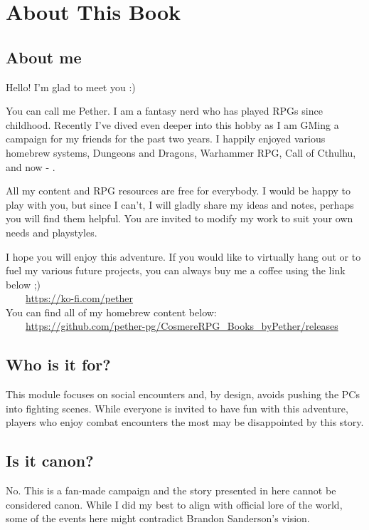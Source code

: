\section{About This Book}

\subsection{About me}

Hello! I'm glad to meet you :)

You can call me Pether. I am a fantasy nerd who has played RPGs since childhood. Recently I've dived even deeper into this hobby as I am GMing a campaign for my friends for the past two years. I happily enjoyed various homebrew systems, Dungeons and Dragons, Warhammer RPG, Call of Cthulhu, and now - \cosmereRPG{}.

All my content and RPG resources are free for everybody. I would be happy to play with you, but since I can't, I will gladly share my ideas and notes, perhaps you will find them helpful. You are invited to modify my work to suit your own needs and playstyles. 

I hope you will enjoy this adventure. If you would like to virtually hang out or to fuel my various future projects, you can always buy me a coffee using the link below ;) \\

~~~~\url{https://ko-fi.com/pether} \\

You can find all of my \cosmereRPG{} homebrew content below: \\

~~~~\url{https://github.com/pether-pg/CosmereRPG_Books_byPether/releases}


\subsection{Who is it for?}

This module focuses on social encounters and, by design, avoids pushing the PCs into fighting scenes. While everyone is invited to have fun with this adventure, players who enjoy combat encounters the most may be disappointed by this story.

\subsection{Is it canon?}

No. This is a fan-made campaign and the story presented in here cannot be considered canon. While I did my best to align with official lore of the world, some of the events here might contradict Brandon Sanderson’s vision.

